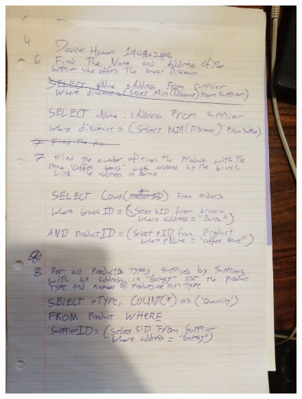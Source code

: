 \documentclass{article}
\begin{document}
	\begin{figure}
		\centering
		\includegraphics[width=\textwidth]{IMG_20210113_113128}
	\end{figure}
	\newpage
\end{document}
